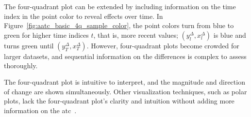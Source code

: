 \documentclass[pdflatex]{sn-jnl}
\theoremstyle{plain}%
\theoremstyle{definition}
\newcommand{\diffxt}[1][t]{x^{\Delta}_{#1}}
\newcommand{\diffyt}[1][t]{y^{\Delta}_{#1}}
\begin{document}
The four-quadrant plot can be extended by including information on the time index in the point color to reveal effects over time.
In Figure~\ref{fig:aatc_basic_4q_sample_color}, the point colors turn from blue to green for higher time indices $t$, that is, more recent values; $(\diffyt[l], \diffxt[l])$ is blue and turns green until $(\diffyt[T], \diffxt[T])$.
However, four-quadrant plots become crowded for larger datasets, and sequential information on the differences is complex to assess thoroughly.

The four-quadrant plot is intuitive to interpret, and the magnitude and direction of change are shown simultaneously.
Other visualization techniques, such as polar plots, lack the four-quadrant plot's clarity and intuition without adding more information on the \ac{atc}~\citep{Saugel2015}.
\end{document}
